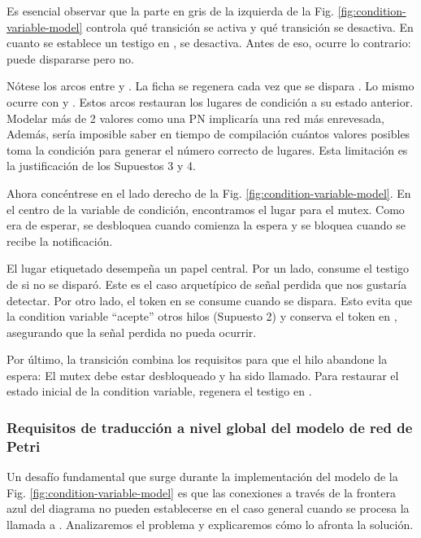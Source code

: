 Es esencial observar que la parte en gris
de la izquierda de la Fig. \ref{fig:condition-variable-model}
controla qué transición se activa y qué transición se desactiva.
En cuanto se establece un testigo en ,  se desactiva.
Antes de eso, ocurre lo contrario:  puede dispararse pero  no.

Nótese los arcos entre  y .
La ficha se regenera cada vez que se dispara .
Lo mismo ocurre con  y .
Estos arcos restauran los lugares de condición a su estado anterior.
Modelar más de 2 valores como una \acrshort{PN} implicaría
una red más enrevesada, Además, sería imposible saber en tiempo de compilación cuántos
valores posibles toma la condición para generar el número correcto de lugares.
Esta limitación es la justificación de los Supuestos 3 y 4.

Ahora concéntrese en el lado derecho de la Fig. \ref{fig:condition-variable-model}.
En el centro de la variable de condición,
encontramos el lugar para el mutex.
Como era de esperar, se desbloquea cuando comienza la
espera y se bloquea cuando se recibe la notificación.

El lugar etiquetado  desempeña un papel central.
Por un lado, consume el testigo de  si  no se disparó.
Este es el caso arquetípico de señal perdida que nos gustaría detectar.
Por otro lado, el token en  se consume cuando  se dispara.
Esto evita que la condition variable ``acepte'' otros hilos (Supuesto 2) y
conserva el token en , asegurando que la señal perdida no pueda ocurrir.

Por último, la transición  combina los requisitos para que el hilo abandone la
espera: El mutex debe estar desbloqueado y  ha sido llamado. Para restaurar el estado
inicial de la condition variable, regenera el testigo en .

\subsubsection{Requisitos de traducción a nivel global del modelo de red de Petri}

Un desafío fundamental que surge
durante la implementación del modelo de la Fig. \ref{fig:condition-variable-model}
es que las conexiones a través de la frontera azul del diagrama no pueden establecerse
en el caso general cuando se procesa la llamada a .
Analizaremos el problema y explicaremos cómo lo afronta la solución.

